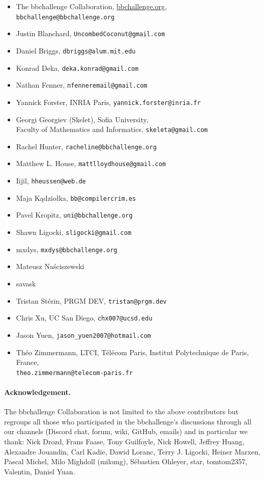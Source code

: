 \documentclass[a4paper,british]{article}
\theoremstyle{definition} %
\numberwithin{equation}{section}
\theoremstyle{definition} %
\begin{document}
\begin{itemize}
    \item The bbchallenge Collaboration, \url{bbchallenge.org}, \texttt{bbchallenge@bbchallenge.org}
    \item Justin Blanchard, \texttt{UncombedCoconut@gmail.com}
    \item Daniel Briggs, \texttt{dbriggs@alum.mit.edu}
    \item Konrad Deka, \texttt{deka.konrad@gmail.com}
    \item Nathan Fenner, \texttt{nfenneremail@gmail.com}
    \item Yannick Forster, INRIA Paris, \texttt{yannick.forster@inria.fr}
    \item Georgi Georgiev (Skelet), Sofia University,\\ Faculty of Mathematics and Informatics, \texttt{skeleta@gmail.com}
    \item Rachel Hunter, \texttt{racheline@bbchallenge.org}
    \item Matthew L. House, \texttt{mattlloydhouse@gmail.com}
    \item Iijil, \texttt{hheussen@web.de}
    \item Maja Kądziołka, \texttt{bb@compilercrim.es}
    \item Pavel Kropitz, \texttt{uni@bbchallenge.org}
    \item Shawn Ligocki, \texttt{sligocki@gmail.com}
    \item mxdys, \texttt{mxdys@bbchallenge.org}
    \item Mateusz Na\'{s}ciszewski
    \item savask
    \item Tristan Stérin, PRGM DEV, \texttt{tristan@prgm.dev}
    \item Chris Xu, UC San Diego, \texttt{chx007@ucsd.edu}
    \item Jason Yuen, \texttt{jason\_yuen2007@hotmail.com}
    \item Théo Zimmermann, LTCI, Télécom Paris, Institut Polytechnique de Paris, France, \\ \texttt{theo.zimmermann@telecom-paris.fr}
\end{itemize}

\paragraph{Acknowledgement.} The bbchallenge Collaboration is not limited to the above contributors but regroups all those who participated in the bbchallenge's discussions through all our channels (Discord chat, forum, wiki, GitHub, emails) and in particular we thank:  Nick Drozd, Frans Faase, Tony Guilfoyle, Nick Howell, Jeffrey Huang, Alexandre Jouandin, Carl Kadie, Dawid Loranc, Terry J. Ligocki, Heiner Marxen, Pascal Michel, Milo Mighdoll (milomg), Sébastien Ohleyer, star, tomtom2357, Valentin, Daniel Yuan.
\end{document}
